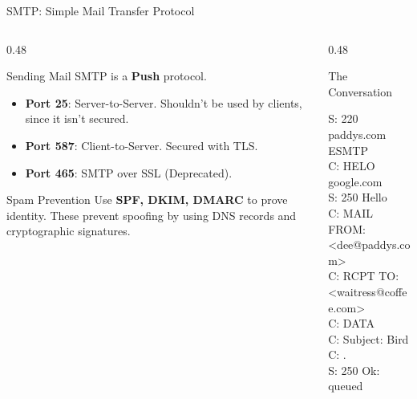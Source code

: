 \documentclass[aspectratio=169]{beamer}  %
\begin{document}
\begin{frame}{SMTP: Simple Mail Transfer Protocol}
    \begin{columns}[T]
        \begin{column}{0.48\textwidth}
            \begin{block}{Sending Mail}
                \small
                SMTP is a \textbf{Push} protocol.
                \begin{itemize}
                    \item \textbf{Port 25}: Server-to-Server. Shouldn't be used by clients, since it isn't secured. 
                    \item \textbf{Port 587}: Client-to-Server. Secured with TLS.
                    \item \textbf{Port 465}: SMTP over SSL (Deprecated).
                \end{itemize}
            \end{block}
            \begin{alertblock}{Spam Prevention}
                \small
                Use \textbf{SPF, DKIM, DMARC} to prove identity. These prevent spoofing by using DNS records and cryptographic signatures.
            \end{alertblock}
        \end{column}
        \begin{column}{0.48\textwidth}
            \begin{exampleblock}{The Conversation}
                \ttfamily\scriptsize

                S: 220 paddys.com ESMTP\\
                C: HELO google.com\\
                S: 250 Hello\\
                C: MAIL FROM: <dee@paddys.com>\\
                C: RCPT TO: <waitress@coffee.com>\\
                C: DATA\\
                C: Subject: Bird\\
                C: .\\
                S: 250 Ok: queued
            \end{exampleblock}
        \end{column}
    \end{columns}
\end{frame}
\end{document}
